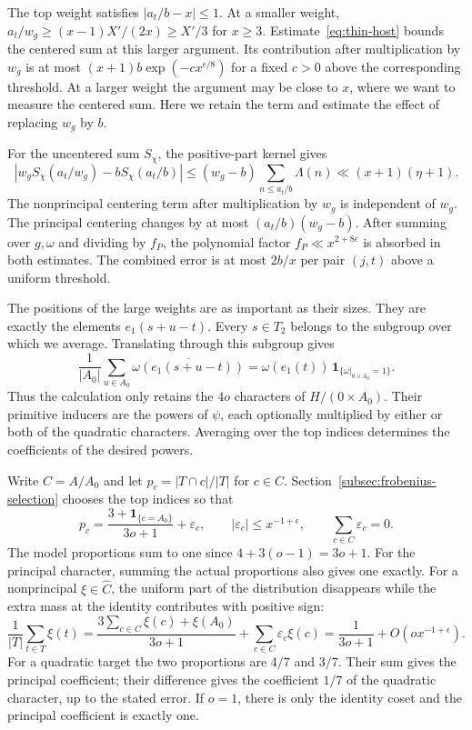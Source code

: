 The top weight satisfies \(|a_t/b-x|\le1\). At a smaller weight,
\(a_t/w_g\ge (x-1)X'/(2x)\ge X'/3\) for \(x\ge3\).
Estimate~\eqref{eq:thin-host} bounds the centered sum at this larger
argument. Its contribution after multiplication by \(w_g\) is at most
\((x+1)b\exp(-c x^{\epsilon/8})\) for a fixed \(c>0\) above the
corresponding threshold. At a larger weight the argument may be close
to \(x\), where we want to measure the centered sum. Here we retain the
term and estimate the effect of replacing \(w_g\) by \(b\).

For the uncentered sum \(S_\chi\), the positive-part kernel gives
\[
 \left|w_gS_\chi(a_t/w_g)-b S_\chi(a_t/b)\right|
 \le(w_g-b)\sum_{n\le a_t/b}\Lambda(n)\ll (x+1)(\eta+1).
\]
The nonprincipal centering term after multiplication by \(w_g\) is
independent of \(w_g\). The principal centering changes by at most
\((a_t/b)(w_g-b)\). After summing over \(g,\omega\) and dividing by
\(f_P\), the polynomial factor \(f_P\ll x^{2+8\epsilon}\) is absorbed
in both estimates. The combined error is at most \(2b/x\) per pair
\((j,t)\) above a uniform threshold.

The positions of the large weights are as important as their sizes.
They are exactly the elements \(e_1(s+u-t)\).
Every \(s\in T_2\) belongs to the subgroup over which we
average. Translating through this subgroup gives
\[
 \frac1{|A_0|}\sum_{u\in A_0}\overline{\omega(e_1(s+u-t))}
   =\omega(e_1(t))\,\mathbf 1_{\{\omega|_{0\times A_0}=1\}}.
\]
Thus the calculation only retains the \(4o\) characters of
\(H/(0\times A_0)\). Their primitive inducers are the powers of
\(\psi\), each optionally multiplied by either or both of the
quadratic characters. Averaging over the top indices determines the
coefficients of the desired powers.

Write \(C=A/A_0\) and let \(p_c=|T\cap c|/|T|\) for \(c\in C\).
Section~\ref{subsec:frobenius-selection} chooses the top indices so that
\[
 p_c=\frac{3+\mathbf1_{\{c=A_0\}}}{3o+1}+\varepsilon_c,\qquad
 |\varepsilon_c|\le x^{-1+\epsilon},\qquad \sum_{c\in C}\varepsilon_c=0 .
\]
The model proportions sum to one since \(4+3(o-1)=3o+1\).
For the principal character, summing the actual proportions also gives
one exactly. For a nonprincipal \(\xi\in\widehat C\), the uniform part
of the distribution disappears while the extra mass at the identity
contributes with positive sign:
\[
 \frac1{|T|}\sum_{t\in T}\xi(t)
  =\frac{3\sum_{c\in C}\xi(c)+\xi(A_0)}{3o+1}
        +\sum_{c\in C}\varepsilon_c\xi(c)
  =\frac{1}{3o+1}+O(o x^{-1+\epsilon}).
\]
For a quadratic target the two proportions are \(4/7\) and \(3/7\).
Their sum gives the principal coefficient; their difference gives
the coefficient \(1/7\) of the quadratic character, up to the stated
error. If \(o=1\), there is only the identity coset and the principal
coefficient is exactly one.

